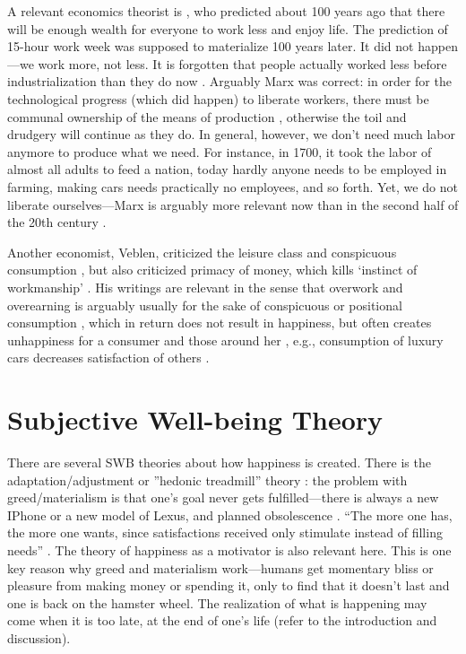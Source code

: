 \documentclass[10pt, letterpaper]{article}
\begin{document}
\begin{spacing}{1.8}
A relevant economics theorist is \citet{keynes30}, who predicted about 100 years
ago that there will be enough wealth for everyone to work less and enjoy
life. The prediction of 15-hour work week was supposed to materialize 100 years later.
It did not happen---we work more, not less. It is forgotten that people
actually worked less before industrialization than they do now
\citep{schor08}. %
 Arguably Marx was correct: in order for the technological progress (which
 did happen) to liberate workers, there must be communal ownership of the means of
 production \citep{spencer20}, otherwise the toil and drudgery will continue as
 they do. 
In general, however, we don't need much labor anymore to produce what we need. For instance,
 in 1700, it took the labor of almost all adults to feed a nation, today hardly
 anyone needs to be employed in farming, making cars needs practically no
 employees, and so forth. Yet, we do not liberate ourselves---Marx is arguably
 more relevant now than in the second half of the 20th century %
\citep{piketty14,peet15,menandMISC16oct3}. %

Another economist, Veblen, criticized the leisure class and conspicuous consumption
\citep{veblen05a,veblen05b}, but also criticized  primacy of money, which kills
`instinct of workmanship' \citep{spencer20}. His writings are relevant in the sense that overwork
and overearning is arguably usually for the sake of conspicuous or positional
consumption \citep{haight1997padded},  %
which in return does not result in happiness, but often creates
unhappiness for a consumer and those around her
\citep{frank12,frank_nyt_mar_20_14,frank08,frank04,kasser13,schmuck00}, e.g., consumption of luxury
  cars decreases satisfaction of others \citep{winkelmann12}.


\section{Subjective Well-being Theory}

There are several SWB theories about how happiness is created. There is the adaptation/adjustment or ''hedonic treadmill'' theory \citep{brickman78cj}: the problem with greed/materialism is that one's goal never gets fulfilled---there is
always a new IPhone or a new model of Lexus, and planned obsolescence \citep{satyro2018planned,agrawal2016limits}. %
%
``The more one has, the more one wants, since satisfactions received only
stimulate instead of filling needs'' \citep[][p. 248]{durkheim50}. 
%
The theory of happiness as a motivator \citep{carver90} is also relevant
here. This is one key reason why greed and materialism  work---humans get
momentary bliss or pleasure from making money or spending it, only to find that
it doesn't last and one is back on the hamster wheel. The realization of
what is happening may come when it is too late, at the end of one's life (refer
to the introduction and discussion).


\end{spacing}
\end{document}

